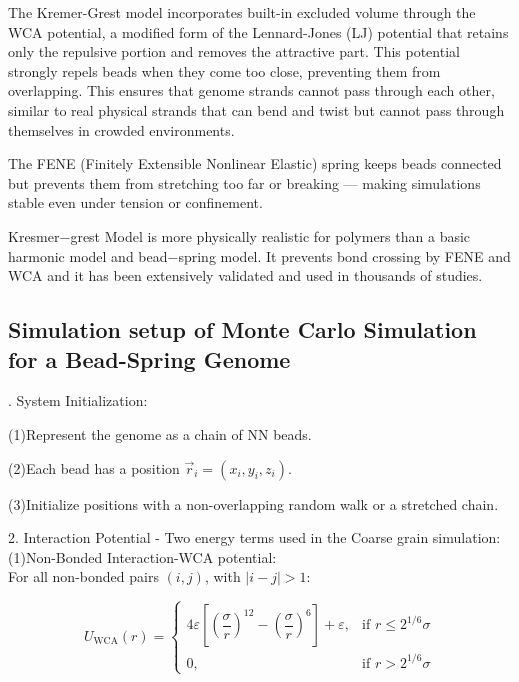 \documentclass[12pt]{article}
\begin{document}
\begin{flushleft}
The Kremer-Grest model incorporates built-in excluded volume through the WCA potential, a modified form of the Lennard-Jones (LJ) potential that retains only the repulsive portion and removes the attractive part. This potential strongly repels beads when they come too close, preventing them from overlapping. This ensures that genome strands cannot pass through each other, similar to real physical strands that can bend and twist but cannot pass through themselves in crowded environments.

The FENE (Finitely Extensible Nonlinear Elastic) spring keeps beads connected but prevents them from stretching too far or breaking — making simulations stable even under tension or confinement.
	

Kresmer$-$grest Model is more physically realistic for polymers than a basic harmonic model and bead$-$spring model.
It prevents bond crossing by FENE and WCA and it has been extensively validated and used in thousands of studies.








\vspace{-1em} 

\subsection*{Simulation setup of Monte Carlo Simulation for a Bead-Spring Genome}
. System Initialization:

\setlength{\parindent}{6em} (1)Represent the genome as a chain of NN beads.

(2)Each bead has a position $\vec{r}_i = (x_i, y_i, z_i)$.

(3)Initialize positions with a non-overlapping random walk or a stretched chain.\\

\setlength{\parindent}{0pt}




2. Interaction Potential - Two energy terms used in the Coarse grain simulation:\\

\setlength{\parindent}{6em}(1)Non-Bonded Interaction-WCA potential:\\
\setlength{\parindent}{0pt}
\setlength{\parindent}{7em}For all non-bonded pairs $(i, j)$, with $|i - j| > 1$:
\setlength{\parindent}{0pt}

\begin{equation}
U_{\text{WCA}}(r) = 
\begin{cases}
4\varepsilon \left[ \left( \dfrac{\sigma}{r} \right)^{12} - \left( \dfrac{\sigma}{r} \right)^6 \right] + \varepsilon, & \text{if } r \leq 2^{1/6} \sigma \\
0, & \text{if } r > 2^{1/6} \sigma
\end{cases}
\end{equation}



\end{flushleft}
\end{document}
